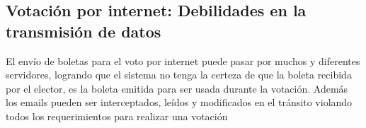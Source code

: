 \subsection{Votación por internet: Debilidades en la transmisión de datos}
El envío de boletas para el voto por internet puede pasar por muchos y diferentes servidores, logrando que el sistema no tenga la certeza de que la boleta recibida por el elector, es la boleta emitida para ser usada durante la votación. Además los emails pueden ser interceptados, leídos y modificados en el tránsito violando todos los requerimientos para realizar una votación


